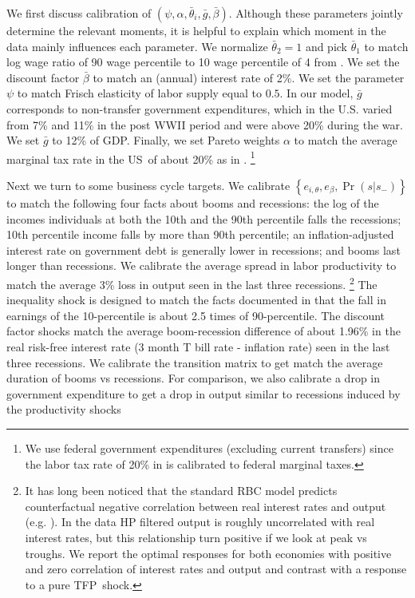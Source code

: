 \documentclass[thmsb,11pt]{article}
\begin{document}
{\smallskip
We first discuss calibration of $\left( \psi ,\alpha ,\bar{\theta}%
_{i},\bar{g},\bar{\beta}\right) $. Although these parameters jointly
determine the relevant moments, it is helpful  to explain which moment
in the data mainly influences each parameter.   We normalize $\bar{\theta}_{2}=1$
and pick $\bar{\theta}_{1}$ to match log wage ratio of 90 wage percentile to
10 wage percentile of 4 from \cite{Autor2008}. We set the discount factor $\bar{\beta}$
 to match an (annual) interest rate of 2\%. We set the parameter $\psi $
to match Frisch elasticity of labor supply equal to $0.5$. In our model, $%
\bar{g}$ corresponds to non-transfer government expenditures, which
in the U.S. varied from 7\%  and  11\% in the post WWII period  and were above 20\% during the war. We set
 $\bar{g}$ to 12\% of GDP. Finally, we set Pareto weights $\alpha $ to match the average
marginal tax rate in the US\ of about 20\% as in \cite{Chari1994}. \footnote{We use federal government expenditures (excluding current transfers) since the labor tax rate of 20\% in  \cite{Chari1994} is calibrated to federal marginal taxes.}

\smallskip Next we turn to some business cycle targets. We calibrate $\left\{
e_{i,\theta },e_{\beta},\Pr \left( s|s_{-}\right) \right\} $ to match the
following four facts about booms and recessions: the log of the  incomes individuals at  both the 10th and the
90th percentile falls  the recessions; 10th percentile income falls by
more than 90th percentile; an  inflation-adjusted interest rate on government
debt is generally lower in recessions; and  booms last longer
than recessions. We calibrate the average spread in labor productivity  to
match the average 3\% loss in output seen in the last three recessions.%
\footnote{%
It has long been noticed that the standard RBC model predicts counterfactual
negative correlation between real interest rates and output (e.g. \cite{Boldrin2001}). In the data HP filtered output is roughly uncorrelated with real
interest rates, but this relationship turn positive if we look at peak vs
troughs. We report the optimal responses for both economies with positive
and zero correlation of interest rates and output and contrast with a
response to a pure TFP\ shock.} The inequality shock is designed to match
the facts documented in \cite{NBERw18035} that the fall in earnings of
the 10-percentile is about 2.5 times of 90-percentile.
 The discount factor shocks
match the average boom-recession difference of about 1.96\% in the real
risk-free interest rate (3 month T bill rate - inflation rate) seen in the
last three recessions. We calibrate the transition matrix  to get match the
average duration of booms vs recessions.
 For comparison, we also calibrate a drop in government expenditure to get a
drop in output  similar to recessions induced by the productivity shocks

}
\end{document}
